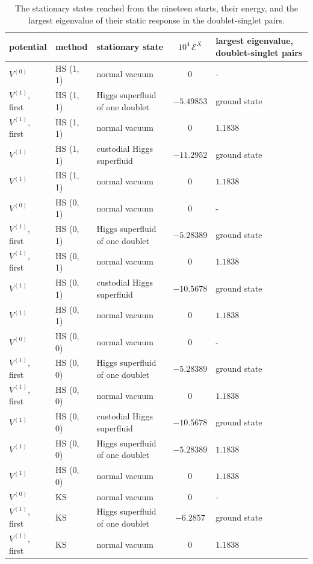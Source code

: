 \documentclass[aps,prd,onecolumn,superscriptaddress,nofootinbib,floatfix,longbibliography]{revtex4-2}
\begin{document}
\begin{table}[!htbp]
\caption{\label{tab:states}The stationary states reached from the nineteen starts, their energy, and the largest eigenvalue of their static response in the doublet-singlet pairs.}
\begingroup\centering\footnotesize\setlength{\tabcolsep}{4pt}
\begin{tabular}{lllcl}
\hline\hline
potential & method & stationary state & $10^4\,\mathcal E^X$ & largest eigenvalue, doublet-singlet pairs \\ \hline
$V^{(0)}$ & HS (1, 1) & normal vacuum & $0$ & - \\
$V^{(1)}$, first & HS (1, 1) & Higgs superfluid of one doublet & $-5.49853$ & ground state \\
$V^{(1)}$, first & HS (1, 1) & normal vacuum & $0$ & $1.1838$ \\
$V^{(1)}$ & HS (1, 1) & custodial Higgs superfluid & $-11.2952$ & ground state \\
$V^{(1)}$ & HS (1, 1) & normal vacuum & $0$ & $1.1838$ \\
$V^{(0)}$ & HS (0, 1) & normal vacuum & $0$ & - \\
$V^{(1)}$, first & HS (0, 1) & Higgs superfluid of one doublet & $-5.28389$ & ground state \\
$V^{(1)}$, first & HS (0, 1) & normal vacuum & $0$ & $1.1838$ \\
$V^{(1)}$ & HS (0, 1) & custodial Higgs superfluid & $-10.5678$ & ground state \\
$V^{(1)}$ & HS (0, 1) & normal vacuum & $0$ & $1.1838$ \\
$V^{(0)}$ & HS (0, 0) & normal vacuum & $0$ & - \\
$V^{(1)}$, first & HS (0, 0) & Higgs superfluid of one doublet & $-5.28389$ & ground state \\
$V^{(1)}$, first & HS (0, 0) & normal vacuum & $0$ & $1.1838$ \\
$V^{(1)}$ & HS (0, 0) & custodial Higgs superfluid & $-10.5678$ & ground state \\
$V^{(1)}$ & HS (0, 0) & Higgs superfluid of one doublet & $-5.28389$ & $1.1838$ \\
$V^{(1)}$ & HS (0, 0) & normal vacuum & $0$ & $1.1838$ \\
$V^{(0)}$ & KS & normal vacuum & $0$ & - \\
$V^{(1)}$, first & KS & Higgs superfluid of one doublet & $-6.2857$ & ground state \\
$V^{(1)}$, first & KS & normal vacuum & $0$ & $1.1838$ \\

\end{tabular}
\end{table}
\end{document}
